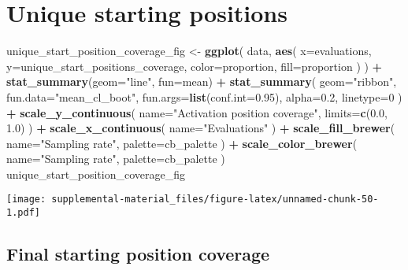 \documentclass[]{book}
\newenvironment{Shaded}{\begin{snugshade}}{\end{snugshade}}
\newcommand{\DataTypeTok}[1]{\textcolor[rgb]{0.13,0.29,0.53}{#1}}
\newcommand{\DecValTok}[1]{\textcolor[rgb]{0.00,0.00,0.81}{#1}}
\newcommand{\FloatTok}[1]{\textcolor[rgb]{0.00,0.00,0.81}{#1}}
\newcommand{\KeywordTok}[1]{\textcolor[rgb]{0.13,0.29,0.53}{\textbf{#1}}}
\newcommand{\NormalTok}[1]{#1}
\newcommand{\OperatorTok}[1]{\textcolor[rgb]{0.81,0.36,0.00}{\textbf{#1}}}
\newcommand{\StringTok}[1]{\textcolor[rgb]{0.31,0.60,0.02}{#1}}
\begin{document}
\hypertarget{unique-starting-positions-4}{%
\section{Unique starting positions}\label{unique-starting-positions-4}}

\begin{Shaded}
\begin{Highlighting}[]
\NormalTok{unique_start_position_coverage_fig <-}\StringTok{ }\KeywordTok{ggplot}\NormalTok{(}
\NormalTok{    data,}
    \KeywordTok{aes}\NormalTok{(}
      \DataTypeTok{x=}\NormalTok{evaluations,}
      \DataTypeTok{y=}\NormalTok{unique_start_positions_coverage,}
      \DataTypeTok{color=}\NormalTok{proportion,}
      \DataTypeTok{fill=}\NormalTok{proportion}
\NormalTok{    )}
\NormalTok{  ) }\OperatorTok{+}
\StringTok{  }\KeywordTok{stat_summary}\NormalTok{(}\DataTypeTok{geom=}\StringTok{"line"}\NormalTok{, }\DataTypeTok{fun=}\NormalTok{mean) }\OperatorTok{+}
\StringTok{  }\KeywordTok{stat_summary}\NormalTok{(}
    \DataTypeTok{geom=}\StringTok{"ribbon"}\NormalTok{,}
    \DataTypeTok{fun.data=}\StringTok{"mean_cl_boot"}\NormalTok{,}
    \DataTypeTok{fun.args=}\KeywordTok{list}\NormalTok{(}\DataTypeTok{conf.int=}\FloatTok{0.95}\NormalTok{),}
    \DataTypeTok{alpha=}\FloatTok{0.2}\NormalTok{,}
    \DataTypeTok{linetype=}\DecValTok{0}
\NormalTok{  ) }\OperatorTok{+}
\StringTok{  }\KeywordTok{scale_y_continuous}\NormalTok{(}
    \DataTypeTok{name=}\StringTok{"Activation position coverage"}\NormalTok{,}
    \DataTypeTok{limits=}\KeywordTok{c}\NormalTok{(}\FloatTok{0.0}\NormalTok{, }\FloatTok{1.0}\NormalTok{)}
\NormalTok{  ) }\OperatorTok{+}
\StringTok{  }\KeywordTok{scale_x_continuous}\NormalTok{(}
    \DataTypeTok{name=}\StringTok{"Evaluations"}
\NormalTok{  ) }\OperatorTok{+}
\StringTok{  }\KeywordTok{scale_fill_brewer}\NormalTok{(}
    \DataTypeTok{name=}\StringTok{"Sampling rate"}\NormalTok{,}
    \DataTypeTok{palette=}\NormalTok{cb_palette}
\NormalTok{  ) }\OperatorTok{+}
\StringTok{  }\KeywordTok{scale_color_brewer}\NormalTok{(}
    \DataTypeTok{name=}\StringTok{"Sampling rate"}\NormalTok{,}
    \DataTypeTok{palette=}\NormalTok{cb_palette}
\NormalTok{  )}
\NormalTok{unique_start_position_coverage_fig}
\end{Highlighting}
\end{Shaded}

\texttt{[image: supplemental-material\_files/figure-latex/unnamed-chunk-50-1.pdf]}

\hypertarget{final-starting-position-coverage-3}{%
\subsection{Final starting position coverage}\label{final-starting-position-coverage-3}}
\end{document}

